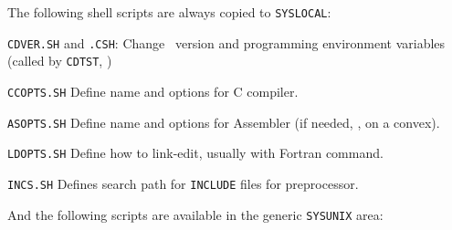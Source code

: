 \medskip

\noindent The following shell scripts are always copied to
{\tt\dol SYSLOCAL}:\medskip

{\parindent=3.7cm
\item{\tt CDVER.SH\quad} and {\tt .CSH}: Change \AIPS\ version and
                programming environment variables (called by
                {\tt\dol CDTST}, \etc)
\item{\tt CCOPTS.SH\quad} Define name and options for C compiler.
\item{\tt ASOPTS.SH\quad} Define name and options for Assembler (if
                          needed, \eg, on a convex).
\item{\tt LDOPTS.SH\quad} Define how to link-edit, usually with Fortran
                          command.
\item{\tt INCS.SH\quad}   Defines search path for {\tt INCLUDE} files
                          for preprocessor.
}\medskip

\noindent And the following scripts are available in the generic
{\tt\dol SYSUNIX} area:\medskip

